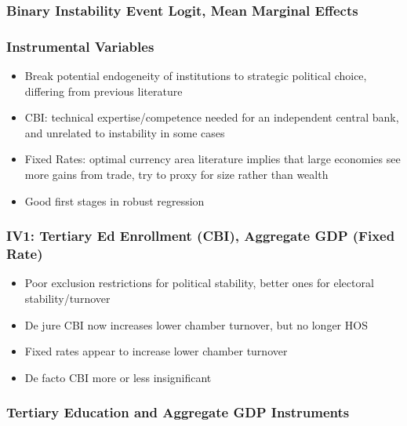 \documentclass{beamer}
\begin{document}
    \begin{frame}
        \frametitle{Binary Instability Event Logit, Mean Marginal Effects}
        {
            \let\oldcentering\centering
            \renewcommand\centering{\tiny\oldcentering}
            
        }
    \end{frame}

    \begin{frame}
        \frametitle{Instrumental Variables}
        \begin{itemize}
            \item Break potential endogeneity of institutions to strategic political choice, differing from previous literature
            \item CBI: technical expertise/competence needed for an independent central bank, and unrelated to instability in some cases
            \item Fixed Rates: optimal currency area literature implies that large economies see more gains from trade, try to proxy for size rather than wealth
            \item Good first stages in robust regression
        \end{itemize}
    \end{frame}

    \begin{frame}
        \frametitle{IV1: Tertiary Ed Enrollment (CBI), Aggregate GDP (Fixed Rate)}
        \begin{itemize}
            \item Poor exclusion restrictions for political stability, better ones for electoral stability/turnover
            \item De jure CBI now increases lower chamber turnover, but no longer HOS
            \item Fixed rates appear to increase lower chamber turnover
            \item De facto CBI more or less insignificant
        \end{itemize}
    \end{frame}

    \begin{frame}
        \frametitle{Tertiary Education and Aggregate GDP Instruments}
        {
            \let\oldcentering\centering
            \renewcommand\centering{\tiny\oldcentering}
            
        }
    \end{frame}
\end{document}
